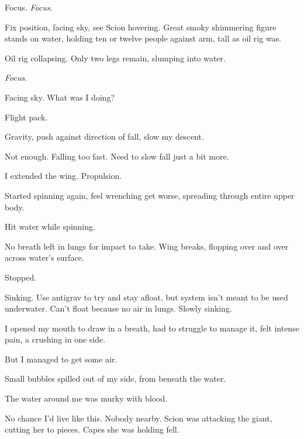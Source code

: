 Focus.  \emph{Focus}.



Fix position, facing sky, see Scion hovering.  Great smoky shimmering figure stands on water, holding ten or twelve people against arm, tall as oil rig was.



Oil rig collapsing.  Only two legs remain, slumping into water.



\emph{Focus}.



Facing sky.  What was I doing?



Flight pack.



Gravity, push against direction of fall, slow my descent.



Not enough.  Falling too fast.  Need to slow fall just a bit more.



I extended the wing.  Propulsion.



Started spinning again, feel wrenching get worse, spreading through entire upper body.



Hit water while spinning.



No breath left in lungs for impact to take.  Wing breaks, flopping over and over across water's surface.



Stopped.



Sinking.  Use antigrav to try and stay afloat, but system isn't meant to be used underwater.  Can't float because no air in lungs.  Slowly sinking.



I opened my mouth to draw in a breath, had to struggle to manage it, felt intense pain, a crushing in one side.



But I managed to get some air.



Small bubbles spilled out of my side, from beneath the water.



The water around me was murky with blood.



No chance I'd live like this.  Nobody nearby.  Scion was attacking the giant, cutting her to pieces.  Capes she was holding fell.



